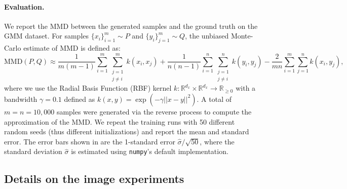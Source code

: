 \paragraph{Evaluation.} We report the \gls*{MMD} \citep{jmlr:v13:gretton12a} between the generated samples and the ground truth on the \gls*{GMM} dataset. For samples $\{x_i\}_{i=1}^m \sim P$ and $\{y_i\}_{j=1}^m \sim Q$, the unbiased Monte-Carlo estimate of \gls*{MMD} is defined as:
\begin{equation*}
    \text{MMD}(P,Q) \approx \frac{1}{m(m-1)} \sum_{i=1}^{m} \sum_{\substack{j=1 \\ j \ne i}}^{m} k( x_i,  x_j)
+ \frac{1}{n(n-1)} \sum_{i=1}^{n} \sum_{\substack{j=1 \\ j \ne i}}^{n} k(y_i, y_j)
- \frac{2}{mn} \sum_{i=1}^{m} \sum_{j=1}^{n} k( x_i, y_j),
\end{equation*}
where we use the Radial Basis Function (RBF) kernel $k: \mathbb{R}^{d_x} \times \mathbb{R}^{d_x} \to \mathbb{R}_{\geq0}$ with a bandwidth $\gamma=0.1$ defined as $k({ x},{y})=\exp\left(-\gamma {{||{ x}-{y}||^{2}}}\right)$. A total of $m=n=10,000$ samples were generated via the reverse process to compute the approximation of the \gls*{MMD}. We repeat the training runs with 50 different random seeds (thus different initializations) and report the mean and standard error. The error bars shown in  are the 1-standard error $\hat{\sigma}/\sqrt{50}$, where the standard deviation $\hat{\sigma}$ is estimated using \texttt{numpy}'s default implementation.

\subsection{Details on the image experiments}
\label{app:image_exp_details}
